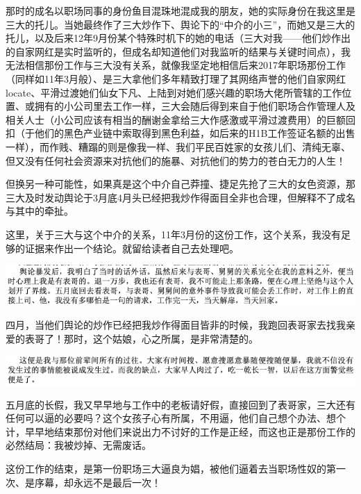 \documentclass[9pt, b5paper]{article}
\begin{document}
那时的成名以职场同事的身份鱼目混珠地混成我的朋友，她的实际身份在我这里是三大的托儿。当她最终作了三大炒作下、舆论下的“中介的小三”，而她又是三大的托儿，以及后来12年9月份某个特殊时机下的她的电话（三大对我——他们炒作出的自家网红是实时监听的，但成名却知道他们对我监听的结果与关键时间点），我无法相信那份工作与三大没有关系，就像我坚定地相信后来2017年职场那份工作（同样如11年3月般）、是三大拿他们多年精致打理了其网络声誉的他们自家网红locate、平滑过渡她们仙女下凡、上陆到对她们感兴趣的职场大佬所管辖的工作位置、或拥有的小公司里去工作一样，三大会随后得到来自于他们职场合作管理人及相关人士（小公司应该有相当的酬谢金拿给三大作感激或平滑过渡费用）的巨额回扣（于他们的黑色产业链中索取得到黑色利益，如后来的H1B工作签证名额的出售一样），而作贱、糟蹋的则是像我一样、我们平民百姓家的女孩儿们、清纯无辜、但又没有任何社会资源来对抗他们的施暴、对抗他们的势力的苍白无力的人生！

但换另一种可能性，如果真是这个中介自己莽撞、捷足先抢了三大的女色资源，那三大及时发动舆论于3月底4月头已经把我炒作得面目全非也合理，但解释不了成名与其中的牵扯。

这里，关于三大与这个中介的关系，11年3月份的这份工作，这个关系，我没有足够的证据来作出一个结论。就留给读者自己去处理吧。

\begin{center}
\includegraphics[width=.9\linewidth]{./pic/backups_plans_20210412_104930.png}
\end{center}

四月，当他们舆论的炒作已经把我炒作得面目皆非的时候，我跑回表哥家去找我亲爱的表哥了！那时，这个姑娘，心之所属，是非常清楚的。

\begin{center}
\includegraphics[width=.9\linewidth]{./pic/backups_plans_20210412_104959.png}
\end{center}

五月底的长假，我又早早地与工作中的老板请好假，直接回到了表哥家，三大还有任何可以逼的必要吗？这个女孩子心有所属，不用逼，他们自己想个办法、想个计，早早地结束那份对他们来说出力不讨好的工作是正经，而这也正是那份工作的必然结局：我被炒掉、无需废话。 

这份工作的结束，是第一份职场三大逼良为娼，被他们逼着去当职场性奴的第一次、是序幕，却永远不是最后一次！
\end{document}
